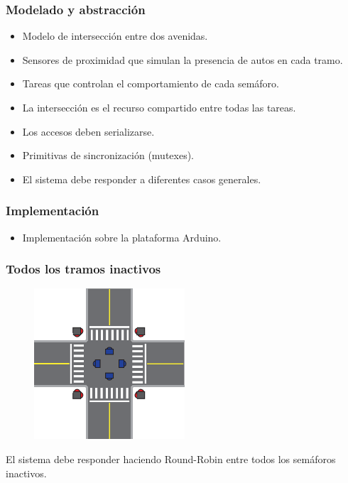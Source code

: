 \begin{frame}
\frametitle{Modelado y abstracción}
\begin{block}{}
	\begin{itemize}
		\item Modelo de intersección entre dos avenidas.
		\item Sensores de proximidad que simulan la presencia de autos en cada tramo.
		\item Tareas que controlan el comportamiento de cada semáforo.
		\item La intersección es el recurso compartido entre todas las tareas.
		\item Los accesos deben serializarse.
		\item Primitivas de sincronización (mutexes).
		\item El sistema debe responder a diferentes casos generales.
	\end{itemize}
\end{block}
\end{frame}

\begin{frame}
\frametitle{Implementación}
\begin{block}{}
	\begin{itemize}
		\item Implementación sobre la plataforma Arduino.
	\end{itemize}
\end{block}
\end{frame}

\begin{frame}
\frametitle{Todos los tramos inactivos}
	\begin{figure}[htbp]
		\centering
		\includegraphics[width=0.50\textwidth]{diagramas/ningun-activo.eps}
	\end{figure}
	El sistema debe responder haciendo Round-Robin entre todos los semáforos inactivos.
\end{frame}

